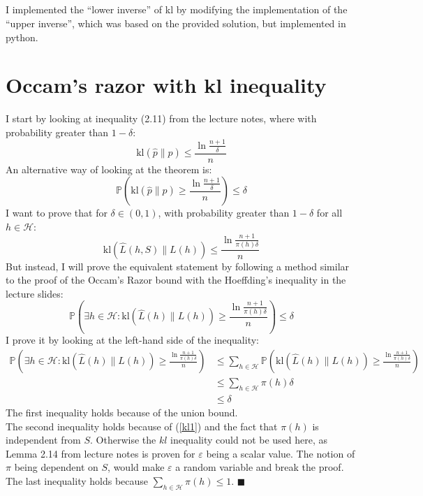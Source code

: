 \documentclass[a4paper]{article}
\newcommand*{\QEDA}{\hfill\ensuremath{\blacksquare}}%
\begin{document}
\subsection{}
\label{subsec:24}
I implemented the ``lower inverse'' of kl by modifying the implementation of the
``upper inverse'', which was based on the provided solution, but implemented in python.

\subsection{}
\label{subsec:25}

\section{Occam’s razor with kl inequality}
I start by looking at inequality (2.11) from the lecture notes, where with
probability greater than $1-\delta$:
$$
\mathrm{kl}(\hat{p} \| p) \leq \frac{\ln \frac{n+1}{\delta}}{n}
$$
An alternative way of looking at the theorem is:
\begin{equation}\label{kl1}
\mathbb{P}(
\mathrm{kl}(\hat{p} \| p) \geq \frac{\ln \frac{n+1}{\delta}}{n}
) \leq \delta \tag{1}
\end{equation}
I want to prove that for $\delta \in(0,1)$, with probability greater than
$1-\delta$ for all $h \in \mathcal{H}$:
$$
\mathrm{kl}(\hat{L}(h, S) \| L(h)) \leq \frac{\ln \frac{n+1}{\pi(h) \delta}}{n}
$$
But instead, I will prove the equivalent statement by following a method similar
to the proof of the Occam's Razor bound with the Hoeffding's inequality in the
lecture slides:
$$
  \mathbb{P}(\exists h \in \mathcal{H} :
  \mathrm{kl}(\hat{L}(h) \| L(h)) \geq \frac{\ln \frac{n+1}{\pi(h)\delta}}{n})
  \leq \delta
$$
I prove it by looking at the left-hand side of the inequality:
\begin{align*}
  \mathbb{P}(\exists h \in \mathcal{H} :
  \mathrm{kl}(\hat{L}(h) \| L(h)) \geq \frac{\ln \frac{n+1}{\pi(h)\delta}}{n})
  &\leq
  \sum_{h \in \mathcal{H}}
  \mathbb{P} (\mathrm{kl}(\hat{L}(h) \| L(h)) \geq \frac{\ln \frac{n+1}{\pi(h)\delta}}{n})\\
  &\leq
  \sum_{h \in \mathcal{H}}\pi(h)\delta \\
  &\leq
  \delta
\end{align*}
The first inequality holds because of the union bound.\\
The second inequality holds because of (\ref{kl1}) and the fact that $\pi(h)$ is
independent from $S$. Otherwise the $kl$ inequality could not be used here, as Lemma 2.14
from lecture notes is proven for $\varepsilon$ being a scalar value. The
notion of $\pi$ being dependent on $S$, would make $\varepsilon$ a random
variable and break the proof.\\
The last inequality holds because
$\sum_{h \in \mathcal{H}} \pi(h) \leq 1$. \QEDA
\end{document}
